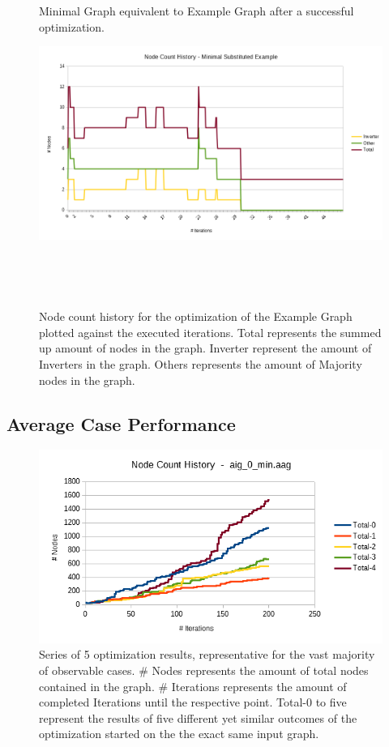 \documentclass[
	accentcolor=1c,%
	type=intern,
	marginpar=false,
	ruledheaders=section,
	class=report,
	BCOR=5mm,
      parskip=half-,
	fontsize=10pt
	]{tudapub}
\begin{document}
\begin{figure}[!ht]
\begin{minipage}{\textwidth}
\begin{minipage}{.45\textwidth}
						\caption{Minimal Graph equivalent to Example Graph after a successful optimization.}
						\label{fig_2}
					\end{minipage} \quad
					\begin{minipage}{.45\textwidth}
						\includegraphics[width=\textwidth]{images/eval_3.png}
						\caption{Node count history for the optimization of the Example Graph plotted against the executed iterations. Total represents the summed up amount of nodes in the graph. Inverter represent the amount of Inverters in the graph. Others represents the amount of Majority nodes in the graph.}
						\label{fig_3}
					\end{minipage}\\
				\end{minipage}\\[1em]
			\end{figure}

		\subsection{Average Case Performance}
			\begin{figure}[!ht]
				\includegraphics[width=\textwidth]{images/eval_4.png}
				\caption{Series of 5 optimization results, representative for the vast majority of observable cases. \# Nodes represents the amount of total nodes contained in the graph. \# Iterations represents the amount of completed Iterations until the respective point. Total-0 to five represent the results of five different yet similar outcomes of the optimization started on the the exact same input graph.}
				\label{fig_4}
			\end{figure}
\end{document}

